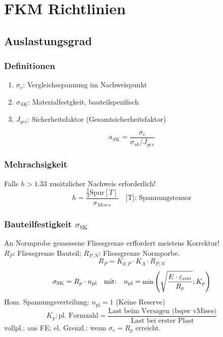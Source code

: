 \vspace{-2mm}
\section{FKM Richtlinien}{}
    \subsection{Auslastungsgrad}
     
        \subsubsection{Definitionen}
            \begin{enumerate}[noitemsep]
                \item $\sigma_{v}$: Vergleichsspannung im Nachweispunkt
                \item $\sigma_{SK}$: Materialfestgkeit, bauteilspezifisch
                \item $J_{ges}$: Sicherheitsfaktor (Gesamtsicherheitsfaktor)
            \end{enumerate}
            \[a_{SK} = \frac{\sigma_{v}}{\sigma_{sk}/J_{ges}} \]
    
        \subsubsection{Mehrachsigkeit}
            Falls $h > 1.33$ zusätzlicher Nachweis erforderlich! 
            \[ h = \frac{\frac{1}{3} \textrm{Spur}[T]}{\sigma_{Mises}} \quad \textrm{[T]: Spannungstensor}\]
        \subsubsection{Bauteilfestigkeit $\sigma_{\textrm{SK}}$}
            An Normprobe gemessene Fliessgrenze erffordert meistens Korrektur! \\$R_P$: Fliessgrenze Bauteil; $R_{P,N}$: Fliessgrenze Normporbe.
            \vspace{-2mm}
            \[R_P = K_{d,P}\cdot K_A\cdot R_{P,N}\]
            \vspace{-5mm}
            \[\sigma_{\textrm{SK}}=R_p\cdot n_{\textrm{pl}} \quad\textrm{mit:}\quad \small n_{\textrm{pl}}=\textrm{min} \left( \sqrt{ \frac{E\cdot\varepsilon_{\textrm{ertr}}}{R_p}};K_p \right) \]\normalsize
            Hom. Spannungsverteilung: $n_{\textrm{pl}}=1$ (Keine Reserve)
            \vspace{-2mm}
            \[K_p: \textrm{pl. Formzahl} = \frac{\textrm{Last beim Versagen 
            (bspw vMises)}}{\textrm{Last bei erster Plast}}\]
            vollpl.: aus FE; el. Grenzl.: wenn $\sigma_v = R_p$ erreicht.
